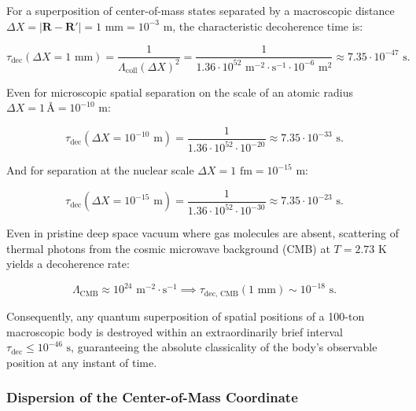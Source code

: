 \documentclass[11pt,a4paper]{article}
\theoremstyle{definition}
\begin{document}
For a superposition of center-of-mass states separated by a macroscopic distance $\Delta X = |\mathbf{R} - \mathbf{R}'| = 1\text{ mm} = 10^{-3}\text{ m}$, the characteristic decoherence time is:

\begin{equation}\label{eq:5.11}\tag{5.11}
\tau_{\text{dec}}(\Delta X = 1\text{ mm}) = \frac{1}{\Lambda_{\text{coll}} (\Delta X)^2} = \frac{1}{1.36 \cdot 10^{52}\text{ m}^{-2}\cdot\text{s}^{-1} \cdot 10^{-6}\text{ m}^2} \approx 7.35 \cdot 10^{-47}\text{ s}.
\end{equation}

Even for microscopic spatial separation on the scale of an atomic radius $\Delta X = 1\,\text{\AA} = 10^{-10}\text{ m}$:

\begin{equation}\label{eq:5.12}\tag{5.12}
\tau_{\text{dec}}(\Delta X = 10^{-10}\text{ m}) = \frac{1}{1.36 \cdot 10^{52} \cdot 10^{-20}} \approx 7.35 \cdot 10^{-33}\text{ s}.
\end{equation}

And for separation at the nuclear scale $\Delta X = 1\text{ fm} = 10^{-15}\text{ m}$:

\begin{equation}\label{eq:5.13}\tag{5.13}
\tau_{\text{dec}}(\Delta X = 10^{-15}\text{ m}) = \frac{1}{1.36 \cdot 10^{52} \cdot 10^{-30}} \approx 7.35 \cdot 10^{-23}\text{ s}.
\end{equation}

Even in pristine deep space vacuum where gas molecules are absent, scattering of thermal photons from the cosmic microwave background (CMB) at $T = 2.73\text{ K}$ yields a decoherence rate:

\begin{equation}\label{eq:5.14}\tag{5.14}
\Lambda_{\text{CMB}} \approx 10^{24}\text{ m}^{-2}\cdot\text{s}^{-1} \implies \tau_{\text{dec, CMB}}(1\text{ mm}) \sim 10^{-18}\text{ s}.
\end{equation}

Consequently, any quantum superposition of spatial positions of a 100-ton macroscopic body is destroyed within an extraordinarily brief interval $\tau_{\text{dec}} \le 10^{-46}\text{ s}$, guaranteeing the absolute classicality of the body's observable position at any instant of time.

\subsubsection{Dispersion of the Center-of-Mass Coordinate}\label{sec:5.1.4}
\end{document}

